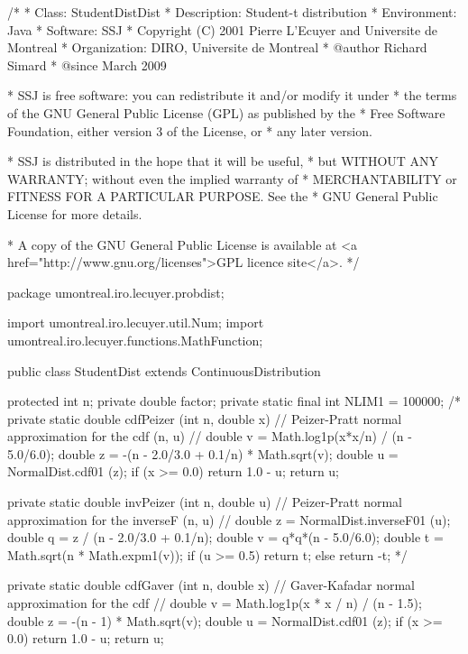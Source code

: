 \begin{code}\begin{hide}
/*
 * Class:        StudentDistDist
 * Description:  Student-t distribution
 * Environment:  Java
 * Software:     SSJ
 * Copyright (C) 2001  Pierre L'Ecuyer and Universite de Montreal
 * Organization: DIRO, Universite de Montreal
 * @author       Richard Simard
 * @since        March 2009

 * SSJ is free software: you can redistribute it and/or modify it under
 * the terms of the GNU General Public License (GPL) as published by the
 * Free Software Foundation, either version 3 of the License, or
 * any later version.

 * SSJ is distributed in the hope that it will be useful,
 * but WITHOUT ANY WARRANTY; without even the implied warranty of
 * MERCHANTABILITY or FITNESS FOR A PARTICULAR PURPOSE.  See the
 * GNU General Public License for more details.

 * A copy of the GNU General Public License is available at
   <a href="http://www.gnu.org/licenses">GPL licence site</a>.
 */
\end{hide}
package umontreal.iro.lecuyer.probdist;
\begin{hide}
import umontreal.iro.lecuyer.util.Num;
import umontreal.iro.lecuyer.functions.MathFunction;
\end{hide}

public class StudentDist extends ContinuousDistribution\begin{hide} {
   protected int n;
   private double factor;
   private static final int NLIM1 = 100000;
/*
   private static double cdfPeizer (int n, double x) {
      // Peizer-Pratt normal approximation for the cdf (n, u)
      // \cite{tPEI68a}
      double v = Math.log1p(x*x/n) / (n - 5.0/6.0);
      double z = -(n - 2.0/3.0 + 0.1/n) * Math.sqrt(v);
      double u = NormalDist.cdf01 (z);
      if (x >= 0.0)
         return 1.0 - u;
      return u;
   }

   private static double invPeizer (int n, double u) {
      // Peizer-Pratt normal approximation for the inverseF (n, u)
      // \cite{tPEI68a}
      double z = NormalDist.inverseF01 (u);
      double q = z / (n - 2.0/3.0 + 0.1/n);
      double v = q*q*(n - 5.0/6.0);
      double t = Math.sqrt(n * Math.expm1(v));
      if (u >= 0.5)
         return t;
      else
         return -t;
   }
*/

   private static double cdfGaver (int n, double x) {
      // Gaver-Kafadar normal approximation for the cdf
      // \cite{tGAV84a}
      double v = Math.log1p(x * x / n) / (n - 1.5);
      double z = -(n - 1) * Math.sqrt(v);
      double u = NormalDist.cdf01 (z);
      if (x >= 0.0)
         return 1.0 - u;
      return u;
   }


}
\end{hide}
\end{code}
